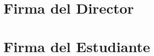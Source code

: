 \documentclass[12pt]{article}
\begin{document}
\vspace{1.5cm}

\section*{Firma del Director}
\vspace{1.5cm}

\section*{Firma del Estudiante	}
\end{document}
